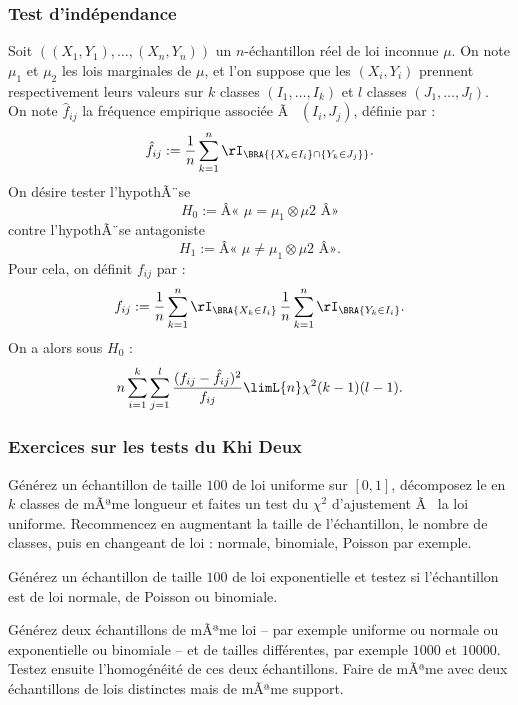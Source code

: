 \subsubsection{Test d'indépendance}

Soit $((X_1,Y_1),\ldots,(X_n,Y_n))$ un $n$-échantillon réel de loi inconnue
$\mu$. On note $\mu_1$ et $\mu_2$ les lois marginales de $\mu$, et l'on
suppose que les $(X_i,Y_i)$ prennent respectivement leurs valeurs sur $k$
classes $(I_1,\ldots,I_k)$ et $l$ classes $(J_1,\ldots,J_l)$. On note $\hat
f_{ij}$ la fréquence empirique associée Ã  $(I_i,J_j)$, définie par :
\begin{equation*}
  \hat f_{ij}
  :=\frac{1}{n}\sum_{k=1}^n \rI_\BRA{\{X_k \in I_i\}\cap\{Y_k \in J_j\}}.
\end{equation*}
On désire tester l'hypothÃ¨se
$$
H_0 := \text{Â« } \mu=\mu_1\otimes\mu2 \text{ Â»}
$$
contre l'hypothÃ¨se antagoniste
$$
H_1 := \text{Â« } \mu \neq \mu_1\otimes\mu2 \text{ Â»}.
$$
Pour cela, on définit $f_{ij}$ par :
\begin{equation*}
  f_{ij}:=
  \frac{1}{n}\sum_{k=1}^n\rI_\BRA{X_k \in I_i}
  \,
  \frac{1}{n}\sum_{k=1}^n\rI_\BRA{Y_k \in I_i}.
\end{equation*}
On a alors sous $H_0$ :
\begin{equation*}
  n\sum_{i=1}^k 
  \sum _{j=1}^l \frac{(f_{ij}-\hat f_{ij})^2}{f_{ij}} 
  \limL{n} \chi^2(k-1)(l-1).
\end{equation*}

\subsubsection{Exercices sur les tests du Khi Deux}

\begin{exo}
  Générez un échantillon de taille $100$ de loi uniforme sur $[0,1]$,
  décomposez le en $k$ classes de mÃªme longueur et faites un test du $\chi^2$
  d'ajustement Ã  la loi uniforme. Recommencez en augmentant la taille de
  l'échantillon, le nombre de classes, puis en changeant de loi : normale,
  binomiale, Poisson par exemple.
\end{exo}

\begin{exo}
  Générez un échantillon de taille $100$ de loi exponentielle et testez si
  l'échantillon est de loi normale, de Poisson ou binomiale.
\end{exo}

\begin{exo}
  Générez deux échantillons de mÃªme loi -- par exemple uniforme ou normale ou
  exponentielle ou binomiale -- et de tailles différentes, par exemple $1000$ et
  $10000$. Testez ensuite l'homogénéité de ces deux échantillons. Faire de
  mÃªme avec deux échantillons de lois distinctes mais de mÃªme support.
\end{exo}

